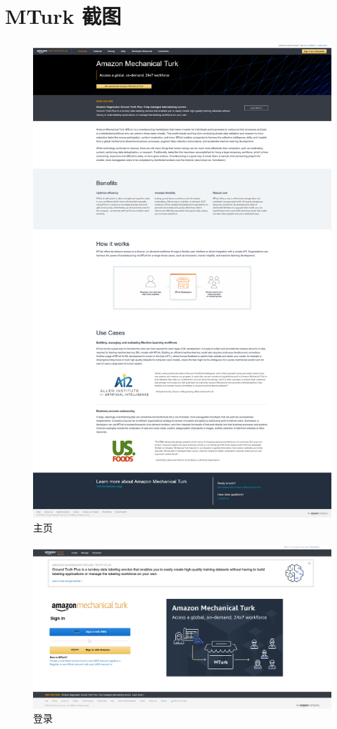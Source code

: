 \section{MTurk 截图} \label{sec:mturk}

\begin{figure}[h!]
    \centering
    \includegraphics[width=0.7\linewidth]{imgs/mturk/home.png}
    \caption{主页}
    \label{fig:home}
\end{figure}

\newpage

\begin{figure}[h!]
    \centering
    \includegraphics[width=0.9\linewidth]{imgs/mturk/login.png}
    \caption{登录}
    \label{fig:login}
\end{figure}


